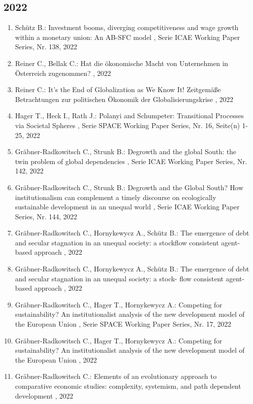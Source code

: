  \subsection*{2022} 
 \begin{enumerate}[leftmargin=*, labelsep=0.5cm] 
	 \item Schütz B.:  Investment booms, diverging competitiveness and wage growth within a monetary union: An AB-SFC model  , Serie ICAE Working Paper Series, Nr. 138, 2022
	 \item Reiner C., Bellak C.:  Hat die ökonomische Macht von Unternehmen in Österreich zugenommen?  , 2022
	 \item Reiner C.:  It’s the End of Globalization as We Know It! Zeitgemäße Betrachtungen zur politischen Ökonomik der Globalisierungskrise  , 2022
	 \item Hager T., Heck I., Rath J.:  Polanyi and Schumpeter: Transitional Processes via Societal Spheres  , Serie SPACE Working Paper Series, Nr. 16, Seite(n) 1-25, 2022
	 \item Gräbner-Radkowitsch C., Strunk B.:  Degrowth and the global South: the twin problem of global dependencies  , Serie ICAE Working Paper Series, Nr. 142, 2022
	 \item Gräbner-Radkowitsch C., Strunk B.:  Degrowth and the Global South? How institutionalism can complement a timely discourse on ecologically sustainable development in an unequal world  , Serie ICAE Working Paper Series, Nr. 144, 2022
	 \item Gräbner-Radkowitsch C., Hornykewycz A., Schütz B.:  The emergence of debt and secular stagnation in an unequal society: a stockflow consistent agent-based approach  , 2022
	 \item Gräbner-Radkowitsch C., Hornykewycz A., Schütz B.:  The emergence of debt and secular stagnation in an unequal society: a stock- flow consistent agent-based approach  , 2022
	 \item Gräbner-Radkowitsch C., Hager T., Hornykewycz A.:  Competing for sustainability? An institutionalist analysis of the new development model of the European Union  , Serie SPACE Working Paper Series, Nr. 17, 2022
	 \item Gräbner-Radkowitsch C., Hager T., Hornykewycz A.:  Competing for sustainability? An institutionalist analysis of the new development model of the European Union  , 2022
	 \item Gräbner-Radkowitsch C.:  Elements of an evolutionary approach to comparative economic studies: complexity, systemism, and path dependent development  , 2022

\end{enumerate}
